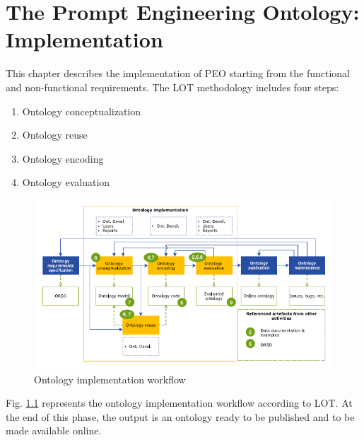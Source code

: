 \chapter{The Prompt Engineering Ontology: Implementation}
\label{chapter:4_implementation}
This chapter describes the implementation of PEO starting from the functional and non-functional requirements.
The LOT methodology includes four steps: 
\begin{enumerate}
    \item Ontology conceptualization

    \item Ontology reuse

    \item Ontology encoding

    \item Ontology evaluation
\end{enumerate}

\begin{figure}[H]
    \centering
    \includegraphics[width=0.9\linewidth]{Figures/fig_14.png}
    \caption{Ontology implementation workflow}
    \label{fig:14}
\end{figure}
Fig. \ref{fig:14} represents the ontology implementation workflow according to LOT.
At the end of this phase, the output is an ontology ready to be published and to be made available online.

